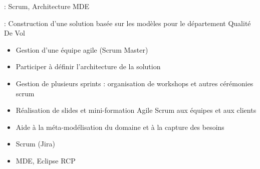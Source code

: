 
 : Scrum, Architecture MDE

 : Construction d'une solution basée sur les modèles pour le département Qualité De Vol 

\bigskip


\begin{itemize}
\item Gestion d'une équipe agile (Scrum Master)
\item Participer à définir l'architecture de la solution
\end{itemize} 


\begin{itemize}
\item Gestion de plusieurs sprints : organisation de workshops et autres cérémonies scrum
\item Réalisation de slides et mini-formation Agile Scrum aux équipes et aux clients
\item Aide à la méta-modélisation du domaine et à la capture des besoins
\end{itemize} 


\begin{itemize}
\item Scrum (Jira)
\item MDE, Eclipse RCP
\end{itemize}